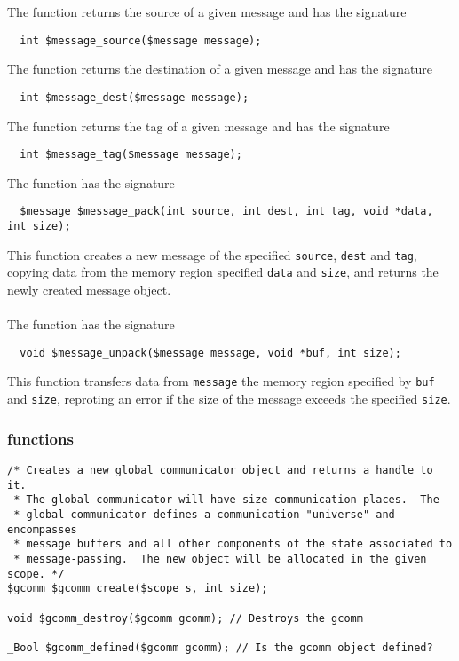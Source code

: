 \noindent The function \cmessagesource{} returns the source of a given message and has the signature

\begin{verbatim}
  int $message_source($message message);
\end{verbatim}

\noindent The function \cmessagedest{} returns the destination of a given message and has the signature

\begin{verbatim}
  int $message_dest($message message);
\end{verbatim}

\noindent The function \cmessagetag{} returns the tag of a given message and has the signature

\begin{verbatim}
  int $message_tag($message message);
\end{verbatim}

\noindent The function \cmessagepack{} has the signature

\begin{verbatim}
  $message $message_pack(int source, int dest, int tag, void *data, int size);
\end{verbatim}

This function creates a new message of the specified \texttt{source}, \texttt{dest} and \texttt{tag}, copying data from the memory region specified \texttt{data} and \texttt{size}, and returns the newly created message object.
\\~\\
\noindent The function \cmessageunpack{} has the signature

\begin{verbatim}
  void $message_unpack($message message, void *buf, int size);
\end{verbatim}

This function transfers data from \texttt{message} the memory region specified by \texttt{buf} and \texttt{size}, reproting an error if the size of the message exceeds the specified \texttt{size}.

\subsubsection{\cgcomm{} functions}
\label{subsubsec:gcomm}

\begin{verbatim}
/* Creates a new global communicator object and returns a handle to it.
 * The global communicator will have size communication places.  The
 * global communicator defines a communication "universe" and encompasses
 * message buffers and all other components of the state associated to
 * message-passing.  The new object will be allocated in the given scope. */
$gcomm $gcomm_create($scope s, int size);

void $gcomm_destroy($gcomm gcomm); // Destroys the gcomm

_Bool $gcomm_defined($gcomm gcomm); // Is the gcomm object defined?
\end{verbatim}

